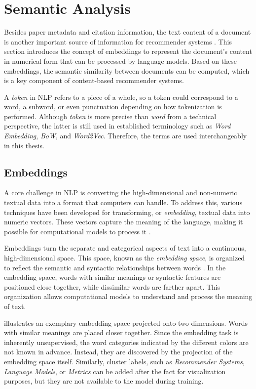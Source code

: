 \section{Semantic Analysis} \label{sec:semantic-analysis}

Besides paper metadata and citation information, the text content of a document is another important source of information for recommender systems \cite{BaiScientificPaper2020,NascimentoSourceIndependent2011}. This section introduces the concept of embeddings to represent the document's content in numerical form that can be processed by language models. Based on these embeddings, the semantic similarity between documents can be computed, which is a key component of content-based recommender systems.

A \emph{token} in \ac{NLP} refers to a piece of a whole, so a token could correspond to a word, a subword, or even punctuation depending on how tokenization is performed. Although \emph{token} is more precise than \emph{word} from a technical perspective, the latter is still used in established terminology such as \emph{Word Embedding}, \emph{\acl{BoW}}, and \emph{Word2Vec}. Therefore, the terms are used interchangeably in this thesis.


\subsection{Embeddings} \label{sec:embeddings}

A core challenge in \ac{NLP} is converting the high-dimensional and non-numeric textual data into a format that computers can handle. To address this, various techniques have been developed for transforming, or \emph{embedding}, textual data into numeric vectors. These vectors capture the meaning of the language, making it possible for computational models to process it \cite{JurafskySpeechLanguage2022}.

Embeddings turn the separate and categorical aspects of text into a continuous, high-dimensional space. This space, known as the \emph{embedding space}, is organized to reflect the semantic and syntactic relationships between words \cite{MikolovEfficientEstimation2013}. In the embedding space, words with similar meanings or syntactic features are positioned close together, while dissimilar words are farther apart. This organization allows computational models to understand and process the meaning of text.

 illustrates an exemplary embedding space projected onto two dimensions. Words with similar meanings are placed closer together. Since the embedding task is inherently unsupervised, the word categories indicated by the different colors are not known in advance. Instead, they are discovered by the projection of the embedding space itself.
Similarly, cluster labels, such as \emph{Recommender Systems}, \emph{Language Models}, or \emph{Metrics} can be added after the fact for visualization purposes, but they are not available to the model during training.

